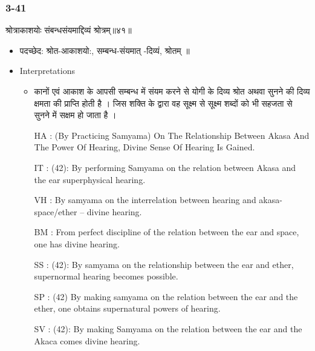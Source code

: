 \begin{frame}[fragile]\frametitle{3-41}
\begin{sanskrit}
श्रोत्राकाशयोः संबन्धसंयमाद्दिव्यं श्रोत्रम्॥४१॥
\end{sanskrit}

	\begin{itemize}
	\item पदच्छेद:   श्रोत-आकाशयो:, सम्बन्ध-संयमात् -दिव्यं, श्रोतम् ॥
	\item Interpretations
		\begin{itemize}	
		\item कानों एवं आकाश के आपसी सम्बन्ध में संयम करने से योगी के दिव्य श्रोत अथवा सुनने की दिव्य क्षमता की प्राप्ति होती है । जिस शक्ति के द्वारा वह सूक्ष्म से सूक्ष्म शब्दों को भी सहजता से सुनने में सक्षम हो जाता है ।
		\item [HA]: (By Practicing Samyama) On The Relationship Between Akasa And The Power Of Hearing, Divine Sense Of Hearing Is Gained.
		\item [IT]: (42): By performing Samyama on the relation between Akasa and the ear superphysical hearing.
		\item [VH]: By samyama on the interrelation between hearing and akasa- space/ether – divine hearing.
		\item [BM]: From perfect discipline of the relation between the ear and space, one has divine hearing.
		\item [SS]: (42): By samyama on the relationship between the ear and ether, supernormal hearing becomes possible.
		\item [SP]: (42) By making samyama on the relation between the ear and the ether, one obtains supernatural powers of hearing.
		\item [SV]: (42): By making Samyama on the relation between the ear and the Akaca comes divine hearing.
		\end{itemize}
	\end{itemize}
\end{frame}


